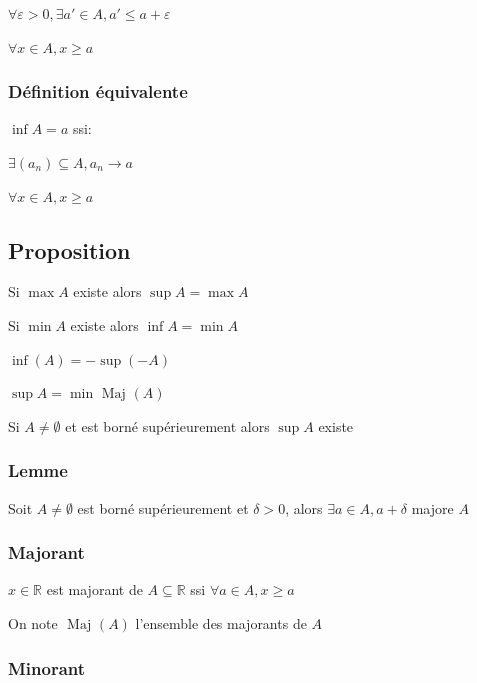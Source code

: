 \documentclass[a4paper,10pt]{article}
\newcommand{\Maj}{\mbox{ Maj }}
\newcommand{\ap}{\rightarrow}
\newcommand{\R}{\mathbb{R}}
\begin{document}
$\forall \varepsilon > 0, \exists a' \in A, a' \leq a + \varepsilon$

$\forall x \in A, x \geq a$

\subsubsection{Définition équivalente}

$\inf A = a$ ssi:

$\exists(a_n) \subseteq A, a_n \ap a$

$\forall x \in A, x \geq a$

\subsection{Proposition}

Si $\max A$ existe alors $\sup A = \max A$

Si $\min A$ existe alors $\inf A = \min A$

$\inf(A) = -\sup(-A)$

$\sup A = \min \Maj(A)$

Si $A \neq \emptyset$ et est borné supérieurement alors $\sup A$ existe





\subsubsection{Lemme}

Soit $A \neq \emptyset$ est borné supérieurement et $\delta > 0$, alors $\exists a \in A, a + \delta$ majore $A$

\subsubsection{Majorant}

$x\in \R$ est majorant de $A \subseteq \R$ ssi $\forall a \in A, x \geq a$

On note $\Maj(A)$ l'ensemble des majorants de $A$

\subsubsection{Minorant}
\end{document}
